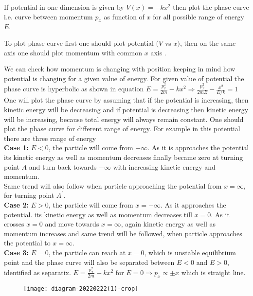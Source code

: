 \begin{example}
 If potential in one dimension is given by $V(x)=-k x^{2}$ then plot the phase curve i.e. curve between momentum $p_{x}$ as function of $x$ for all possible range of energy $E$.
\end{example}
\begin{answer}
	To plot phase curve first one should plot potential $(V$ vs $x)$, then on the same axis one should plot momentum with common $x$ axis .
	
	We can check how momentum is changing with position keeping in mind how potential is changing for a given value of energy. For given value of potential the phase curve is hyperbolic as shown in equation $E=\frac{p_{x}^{2}}{2 m}-k x^{2} \Rightarrow \frac{p_{x}^{2}}{2 m E}-\frac{x^{2}}{E / k}=1$\\
	One will plot the phase curve by assuming that if the potential is increasing, then kinetic energy will be decreasing and if potential is decreasing then kinetic energy will be increasing, because total energy will always remain constant. One should plot the phase curve for different range of energy. For example in this potential there are three range of energy\\
	\textbf{Case 1:} $E<0$, the particle will come from $-\infty .$ As it is approaches the potential its kinetic energy as well as momentum decreases finally became zero at turning point $A$ and turn back towards $-\infty$ with increasing kinetic energy and momentum.\\
	Same trend will also follow when particle approaching the potential from $x=\infty$, for turning point $A^{\prime}$.\\
	\textbf{Case 2:} $E>0$, the particle will come from $x=-\infty$. As it approaches the potential. its kinetic energy as well as momentum decreases till $x=0$. As it crosses $x=0$ and move towards $x=\infty$, again kinetic energy as well as momentum increases and same trend will be followed, when particle approaches the potential to $x=\infty$.\\
	\textbf{Case 3:} $E=0$, the particle can reach at $x=0$, which is unstable equilibrium point and the phase curve will also be separated between $E<0$ and $E>0$, identified as separatix. $E=\frac{p_{x}^{2}}{2 m}-k x^{2}$ for $E=0 \Rightarrow p_{x} \propto \pm x$ which is straight line.\\
	\begin{figure}[H]
		\centering
		\texttt{[image: diagram-20220222(1)-crop]}
	\end{figure}
\end{answer}
